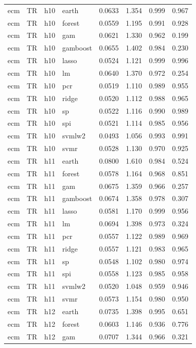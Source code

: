 \begin{ThreePartTable}
\begin{longtable}[t]{llclcccc}
\addlinespace
ecm & TR & h10 & earth & 0.0633 & 1.354 & 0.999 & 0.967\\
ecm & TR & h10 & forest & 0.0559 & 1.195 & 0.991 & 0.928\\
ecm & TR & h10 & gam & 0.0621 & 1.330 & 0.962 & 0.199\\
ecm & TR & h10 & gamboost & 0.0655 & 1.402 & 0.984 & 0.230\\
ecm & TR & h10 & lasso & 0.0524 & 1.121 & 0.999 & 0.996\\
ecm & TR & h10 & lm & 0.0640 & 1.370 & 0.972 & 0.254\\
ecm & TR & h10 & pcr & 0.0519 & 1.110 & 0.989 & 0.955\\
ecm & TR & h10 & ridge & 0.0520 & 1.112 & 0.988 & 0.965\\
ecm & TR & h10 & sp & 0.0522 & 1.116 & 0.990 & 0.989\\
ecm & TR & h10 & spi & 0.0521 & 1.114 & 0.985 & 0.956\\
ecm & TR & h10 & svmlw2 & 0.0493 & 1.056 & 0.993 & 0.991\\
ecm & TR & h10 & svmr & 0.0528 & 1.130 & 0.970 & 0.925\\
\addlinespace
ecm & TR & h11 & earth & 0.0800 & 1.610 & 0.984 & 0.524\\
ecm & TR & h11 & forest & 0.0578 & 1.164 & 0.968 & 0.851\\
ecm & TR & h11 & gam & 0.0675 & 1.359 & 0.966 & 0.257\\
ecm & TR & h11 & gamboost & 0.0674 & 1.358 & 0.978 & 0.307\\
ecm & TR & h11 & lasso & 0.0581 & 1.170 & 0.999 & 0.956\\
ecm & TR & h11 & lm & 0.0694 & 1.398 & 0.973 & 0.324\\
ecm & TR & h11 & pcr & 0.0557 & 1.122 & 0.989 & 0.969\\
ecm & TR & h11 & ridge & 0.0557 & 1.121 & 0.983 & 0.965\\
ecm & TR & h11 & sp & 0.0548 & 1.102 & 0.980 & 0.974\\
ecm & TR & h11 & spi & 0.0558 & 1.123 & 0.985 & 0.958\\
ecm & TR & h11 & svmlw2 & 0.0520 & 1.048 & 0.959 & 0.946\\
ecm & TR & h11 & svmr & 0.0573 & 1.154 & 0.980 & 0.950\\
\addlinespace
ecm & TR & h12 & earth & 0.0735 & 1.398 & 0.995 & 0.651\\
ecm & TR & h12 & forest & 0.0603 & 1.146 & 0.936 & 0.776\\
ecm & TR & h12 & gam & 0.0707 & 1.344 & 0.966 & 0.321\\

\end{longtable}
\end{ThreePartTable}
